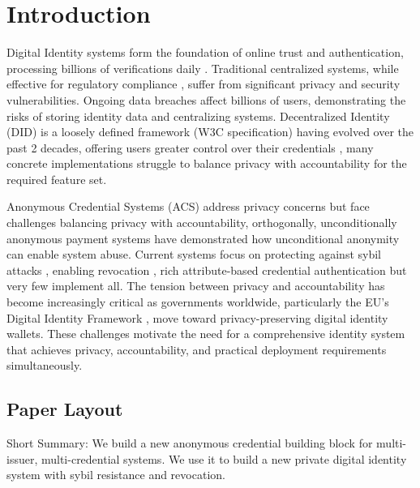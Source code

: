 \section{Introduction}\label{sec:intro}
Digital Identity systems form the foundation of online trust and authentication, processing billions of verifications daily \cite{noauthor_happy_2021, pang_zanzibar_nodate}. Traditional centralized systems, while effective for regulatory compliance \cite{eltayeb_crucial_2024}, suffer from significant privacy and security vulnerabilities. Ongoing data breaches \cite{zhang_data_2022} affect billions of users, demonstrating the risks of storing identity data and centralizing systems. Decentralized Identity (DID) is a loosely defined framework (W3C specification) having evolved over the past 2 decades, offering users greater control over their credentials \cite{soltani_survey_2021}, many concrete implementations struggle to balance privacy with accountability \cite{maram2021candid} for the required feature set. 


\noindent Anonymous Credential Systems (ACS) \cite{chaum1985security,hutchison_signature_2004, hutchison_constant-size_2006, sako_short_2016, fuchsbauer_structure-preserving_2019} address privacy concerns but face challenges balancing privacy with accountability, orthogonally, unconditionally anonymous payment systems have demonstrated how unconditional anonymity can enable system abuse. Current systems focus on protecting against sybil attacks \cite{crites_syra_2024, rabaninejad_attribute-based_nodate}, enabling revocation \cite{goos_dynamic_2002, robshaw_uc_2016, camenisch_scalable_2016, baldimtsi_accumulators_2017}, rich attribute-based credential authentication \cite{rosenberg_zk-creds_2022, babel_bringing_2023} but very few implement all. The tension between privacy and accountability has become increasingly critical as governments worldwide, particularly the EU's Digital Identity Framework \cite{noauthor_regulation_2024}, move toward privacy-preserving digital identity wallets. These challenges motivate the need for a comprehensive identity system that achieves privacy, accountability, and practical deployment requirements simultaneously.

\subsection{Paper Layout}

Short Summary: We build a new anonymous credential building block for multi-issuer, multi-credential systems. We use it to build a new private digital identity system with sybil resistance and revocation.


